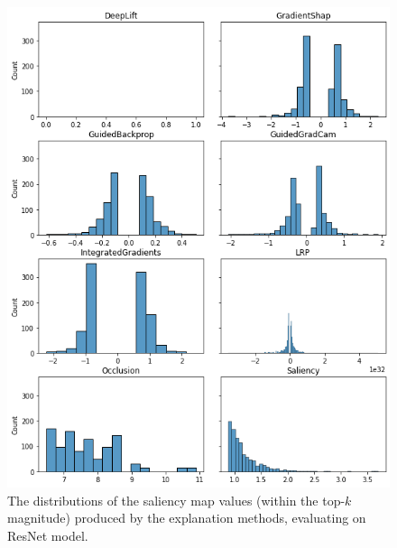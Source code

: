 \begin{figure}
    \centering
    \includegraphics[width=\textwidth]{images/results/saliency-maps-value-distribution-resnet.png}
    \caption{The distributions of the saliency map values (within the top-$k$ magnitude) produced by the explanation methods, evaluating on ResNet model.}
    \label{fig:saliencyMapsValueDistributionResnet}
\end{figure}


